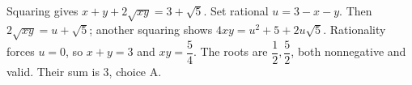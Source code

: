 Squaring gives $x+y+2\sqrt{xy}=3+\sqrt5$. Set rational $u=3-x-y$. Then $2\sqrt{xy}=u+\sqrt5$; another squaring shows $4xy=u^2+5+2u\sqrt5$. Rationality forces $u=0$, so $x+y=3$ and $xy=\dfrac{5}{4}$. The roots are $\dfrac{1}{2},\dfrac{5}{2}$, both nonnegative and valid. Their sum is $\boxed{3}$, choice A.
